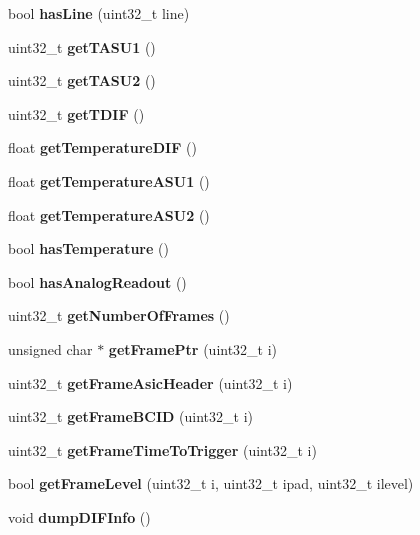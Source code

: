 \begin{DoxyCompactItemize}
\item 
bool {\bfseries has\-Line} (uint32\-\_\-t line)\label{classDIFPtr_a02a04813a664f59ae62c18e7028e1492}

\item 
uint32\-\_\-t {\bfseries get\-T\-A\-S\-U1} ()\label{classDIFPtr_a71bf41db6c238b918d77f31e6cafd8f0}

\item 
uint32\-\_\-t {\bfseries get\-T\-A\-S\-U2} ()\label{classDIFPtr_abcf41a39b0b0b30d0eb2029a38259eb8}

\item 
uint32\-\_\-t {\bfseries get\-T\-D\-I\-F} ()\label{classDIFPtr_a439b05313396e5278faf6bb8a20b0d36}

\item 
float {\bfseries get\-Temperature\-D\-I\-F} ()\label{classDIFPtr_af3aee586fadb7fc6c606d943fb46c06f}

\item 
float {\bfseries get\-Temperature\-A\-S\-U1} ()\label{classDIFPtr_a9b80907d5204fa2cd67edcd6e5bfcffe}

\item 
float {\bfseries get\-Temperature\-A\-S\-U2} ()\label{classDIFPtr_acb4e874dbd731ed2ffaa30c8c12f9e04}

\item 
bool {\bfseries has\-Temperature} ()\label{classDIFPtr_ac610d35950f4b116a7ed4ef5655bcddf}

\item 
bool {\bfseries has\-Analog\-Readout} ()\label{classDIFPtr_a5d02923a395f2a7a97eae4c6b9653773}

\item 
uint32\-\_\-t {\bfseries get\-Number\-Of\-Frames} ()\label{classDIFPtr_a16798cd9a47f3e4358af1fd3ba390164}

\item 
unsigned char $\ast$ {\bfseries get\-Frame\-Ptr} (uint32\-\_\-t i)\label{classDIFPtr_a33da5d922051cec1b9823764b0588d2f}

\item 
uint32\-\_\-t {\bfseries get\-Frame\-Asic\-Header} (uint32\-\_\-t i)\label{classDIFPtr_a4645862d450eaf77011d3425dc841978}

\item 
uint32\-\_\-t {\bfseries get\-Frame\-B\-C\-I\-D} (uint32\-\_\-t i)\label{classDIFPtr_a3ce47db6d214f1e99b97fbb625d248d3}

\item 
uint32\-\_\-t {\bfseries get\-Frame\-Time\-To\-Trigger} (uint32\-\_\-t i)\label{classDIFPtr_a9ca659e4ec65e127990be939f36a73f5}

\item 
bool {\bfseries get\-Frame\-Level} (uint32\-\_\-t i, uint32\-\_\-t ipad, uint32\-\_\-t ilevel)\label{classDIFPtr_af97896aadd544502d319846073c319e0}

\item 
void {\bfseries dump\-D\-I\-F\-Info} ()\label{classDIFPtr_a949bb0b6ac03ddb99c7ec73bd6699ec9}

\end{DoxyCompactItemize}


